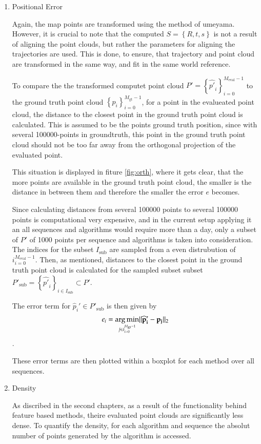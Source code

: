 	\begin{enumerate}
	\item{Positional Error}
	
	Again, the map points are transformed using the method of umeyama. However, it is crucial to note that the computed 
	$S = \left\{R,t,s\right\}$ is not a result of aligning the point clouds, but rather the parameters for aligning the trajectories 
	are used. This is done, to ensure, that trajectory and point cloud are transformed in the same way, and fit in the same world reference. 
	
	To compare the the transformed computet point cloud $P' = \left\{{\widehat{p'}_i}\right\}_{i=0}^{M_{\text{eval}}-1}$ to the ground truth point cloud
	$\left\{p_i\right\}_{i=0}^{M_{\text{gt}}-1}$, for a point in the evalueated point cloud, the distance to the closest point in the ground truth
	point cloud is calculated. This is assumed to be the points ground truth position, since with several 100000-points in groundtruth, this point in 
	the ground truth point cloud should not be too far away from the orthogonal projection of the evaluated point. 
	
	
	This situation is displayed in fiture \ref{fig:orth}, where it gets clear, that the more points are available in the ground truth point cloud, 
	the smaller is the distance in between them and therefore the smaller the error $e$ becomes.

	Since calculating distances from several 100000 points to several 100000 points is computational very expensive, and in the current setup applying 
	it an all sequences and algorithms would require more than a day, only a subset of $P'$ of 1000 points per sequence and algorithms
	is taken into consideration. The indices for the subset $I_{\text{sub}}$ are sampled from a even distrubution of ${i}_{i = 0}^{M_{\text{eval}}-1}$. 
	Then, as mentioned, distances to the closest point in the ground truth point cloud is calculated for the sampled subset subset 
	$P'_{\text{sub}} = \left\{{\widehat{p'}_i}\right\}_{i \in I_{\text{sub}}} \subset P'$. 
	
	The error term for $\widehat{p}_i' \in P'_{\text{sub}}$ is then given by
	$$ e_i = \mathop{\mathrm{arg\,min}}_{j \in {i}_{i=0}^{M_{\text{gt}}-1}} \lVert \mathbf{\widehat{p}_i' - p_j} \rVert_2 $$.
	
	These error terms are then plotted within a boxplot for each method over all sequences. 
	
	\item{Density}
	
	As discribed in the second chapters, as a result of the functionality behind feature based methods, theire evaluated point clouds are 
	significantly less dense. To quantify the density, for each algorithm and sequence the absolut number of points generated by the 
	algorithm is accessed. 
	
	\end{enumerate}
	
